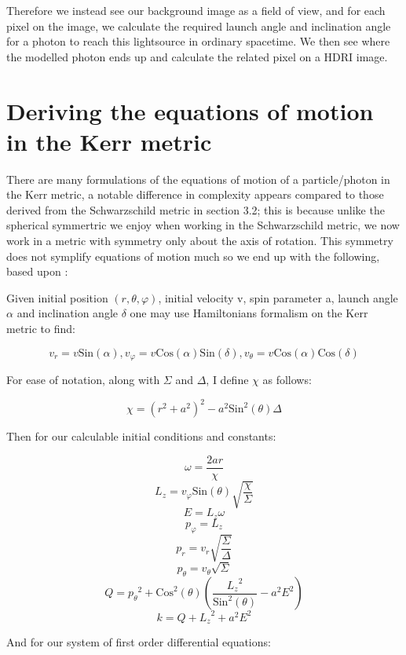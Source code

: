 \documentclass[oneside,openright,frontopenright, singlespacing]{dmathesis}
\begin{document}
\vspace{1em}
	Therefore we instead see our background image as a field of view, and for each pixel on the image, we calculate the required launch angle and inclination angle for a photon to reach this lightsource in ordinary spacetime. We then see where the modelled photon ends up and calculate the related pixel on a HDRI image.

\section{Deriving the equations of motion in the Kerr metric}

	There are many formulations of the equations of motion of a particle/photon in the Kerr metric, a notable difference in complexity appears compared to those derived from the Schwarzschild metric in section 3.2; this is because unlike the spherical symmertric we enjoy when working in the Schwarzschild metric, we now work in a metric with symmetry only about the axis of rotation. This symmetry does not symplify equations of motion much so we end up with the following, based upon \cite{yukterezKerr}:

\vspace{1em}
	Given initial position $(r, \theta, \varphi)$, initial velocity v, spin parameter a, launch angle $\alpha$ and inclination angle $\delta$ one may use Hamiltonians formalism on the Kerr metric to find:
	
	\[v_r = v\mbox{Sin}(\alpha), v_\varphi = v\mbox{Cos}(\alpha)\mbox{Sin}(\delta), v_\theta = v\mbox{Cos}(\alpha)\mbox{Cos}(\delta)\]

\vspace{1em}
	For ease of notation, along with $\Sigma$ and $\Delta$, I define $\chi$ as follows:

	\[\chi = (r^2+a^2)^2-a^2\mbox{Sin}^2(\theta)\Delta\]

\vspace{1em}
	Then for our calculable initial conditions and constants:

	\[\omega = \frac{2ar}{\chi}\]
	\[L_{z} = v_{\varphi}\mbox{Sin}(\theta)\sqrt{\frac{\chi}{\Sigma}}\]
	\[ E = L_{z}\omega\]
	\[p_{\varphi} = L_{z}\]
	\[p_{r} = v_{r}\sqrt{\frac{\Sigma}{\Delta}}\]
	\[p_{\theta} = v_{\theta}\sqrt{\Sigma}\]
	\[Q = {p_{\theta}}^2+\mbox{Cos}^2(\theta)\left(\frac{{L_{z}}^2}{\mbox{Sin}^2(\theta)}-a^2E^2\right)\]
	\[k = Q+{L_{z}}^2+a^2E^2\]

\vspace{1em}
	And for our system of first order differential equations:
\end{document}
